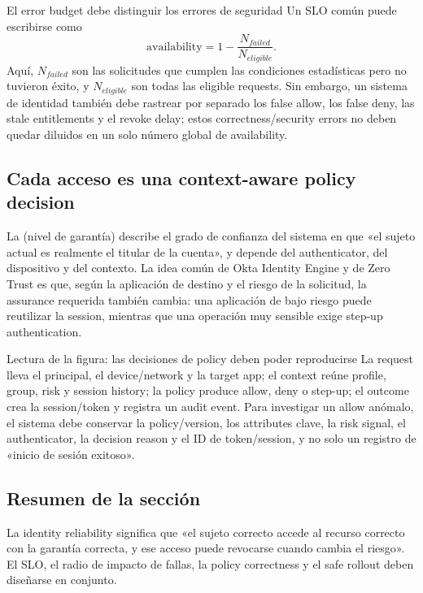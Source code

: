 \begin{importantbox}{El error budget debe distinguir los errores de seguridad}
Un SLO común puede escribirse como
\[
\mathrm{availability}=1-\frac{N_{failed}}{N_{eligible}}.
\]
Aquí, $N_{failed}$ son las solicitudes que cumplen las condiciones estadísticas pero no tuvieron éxito, y $N_{eligible}$ son todas las eligible requests. Sin embargo, un sistema de identidad también debe rastrear por separado los false allow, los false deny, las stale entitlements y el revoke delay; estos correctness/security errors no deben quedar diluidos en un solo número global de availability.
\end{importantbox}

\subsection{Cada acceso es una context-aware policy decision}

La  (nivel de garantía) describe el grado de confianza del sistema en que «el sujeto actual es realmente el titular de la cuenta», y depende del authenticator, del dispositivo y del contexto. La idea común de Okta Identity Engine y de Zero Trust es que, según la aplicación de destino y el riesgo de la solicitud, la assurance requerida también cambia: una aplicación de bajo riesgo puede reutilizar la session, mientras que una operación muy sensible exige step-up authentication.


\begin{knowledgebox}{Lectura de la figura: las decisiones de policy deben poder reproducirse}
La request lleva el principal, el device/network y la target app; el context reúne profile, group, risk y session history; la policy produce allow, deny o step-up; el outcome crea la session/token y registra un audit event. Para investigar un allow anómalo, el sistema debe conservar la policy/version, los attributes clave, la risk signal, el authenticator, la decision reason y el ID de token/session, y no solo un registro de «inicio de sesión exitoso».
\end{knowledgebox}

\subsection{Resumen de la sección}

La identity reliability significa que «el sujeto correcto accede al recurso correcto con la garantía correcta, y ese acceso puede revocarse cuando cambia el riesgo». El SLO, el radio de impacto de fallas, la policy correctness y el safe rollout deben diseñarse en conjunto.
